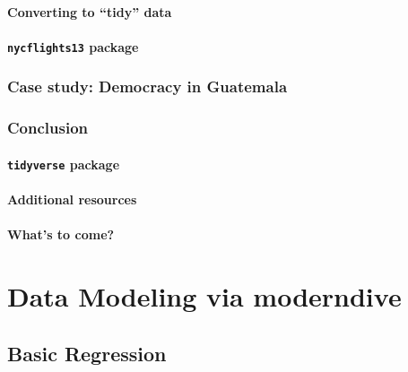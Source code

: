 \documentclass[12pt, krantz2,]{krantz}
\begin{document}
\hypertarget{converting-to-tidy-data}{%
\subsection{Converting to ``tidy'' data}\label{converting-to-tidy-data}}

\hypertarget{nycflights13-package-1}{%
\subsection{\texorpdfstring{\texttt{nycflights13} package}{nycflights13 package}}\label{nycflights13-package-1}}

\hypertarget{case-study-tidy}{%
\section{Case study: Democracy in Guatemala}\label{case-study-tidy}}

\hypertarget{conclusion-3}{%
\section{Conclusion}\label{conclusion-3}}

\hypertarget{tidyverse-package}{%
\subsection{\texorpdfstring{\texttt{tidyverse} package}{tidyverse package}}\label{tidyverse-package}}

\hypertarget{additional-resources-3}{%
\subsection{Additional resources}\label{additional-resources-3}}

\hypertarget{whats-to-come-2}{%
\subsection{What's to come?}\label{whats-to-come-2}}

\hypertarget{part-data-modeling-via-moderndive}{%
\part{Data Modeling via moderndive}\label{part-data-modeling-via-moderndive}}

\hypertarget{regression}{%
\chapter{Basic Regression}\label{regression}}
\end{document}
